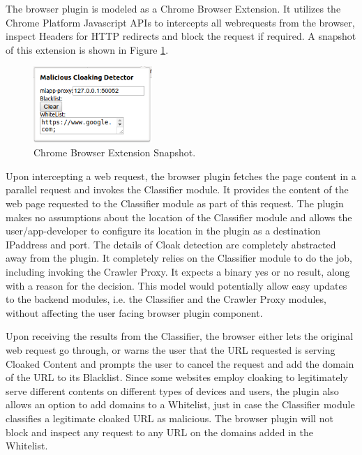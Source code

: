 \documentclass[letterpaper,twocolumn,10pt]{article}
\begin{document}
The browser plugin is modeled as a Chrome Browser Extension. It utilizes the Chrome Platform Javascript APIs to intercepts all webrequests from the browser, inspect Headers for HTTP redirects and block the request if required. A snapshot of this extension is shown in Figure \ref{fig:plugin}.

\begin{figure}[t]
  \centering
  \includegraphics[width=0.4\textwidth]{./proj_plugin.png}
  \caption{Chrome Browser Extension Snapshot.}
  \label{fig:plugin}
\end{figure}

Upon intercepting a web request, the browser plugin fetches the page content in a parallel request and invokes the Classifier module. It provides the content of the web page requested to the Classifier module as part of this request. The plugin makes no assumptions about the location of the Classifier module and allows the user/app-developer to configure its location in the plugin as a destination IPaddress and port. The details of Cloak detection are completely abstracted away from the plugin. It completely relies on the Classifier module to do the job, including invoking the Crawler Proxy. It expects a binary yes or no result, along with a reason for the decision. This model would potentially allow easy updates to the backend modules, i.e. the Classifier and the Crawler Proxy modules, without affecting the user facing browser plugin component.

Upon receiving the results from the Classifier, the browser either lets the original web request go through, or warns the user that the URL requested is serving Cloaked Content and prompts the user to cancel the request and add the domain of the URL to its Blacklist. Since some websites employ cloaking to legitimately serve different contents on different types of devices and users, the plugin also allows an option to add domains to a Whitelist, just in case the Classifier module classifies a legitimate cloaked URL as malicious. The browser plugin will not block and inspect any request to any URL on the domains added in the Whitelist.
\end{document}

